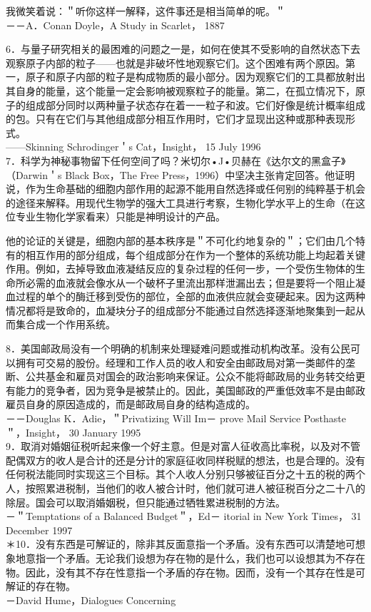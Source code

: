 我微笑着说：＂听你这样一解释，这件事还是相当简单的呢。＂\\
－－A．Conan Doyle，A Study in Scarlet， 1887

6．与量子研究相关的最困难的问题之一是，如何在使其不受影响的自然状态下去观察原子内部的粒子——也就是非破坏性地观察它们。这个困难有两个原因。第一，原子和原子内部的粒子是构成物质的最小部分。因为观察它们的工具都放射出其自身的能量，这个能量一定会影响被观察粒子的能量。第二，在孤立情况下，原子的组成部分同时以两种量子状态存在着一一粒子和波。它们好像是统计概率组成的包。只有在它们与其他组成部分相互作用时，它们才显现出这种或那种表现形式。\\
——Skinning Schrodinger＇s Cat，Insight， 15 July 1996\\
7．科学为神秘事物留下任何空间了吗？米切尔•J•贝赫在《达尔文的黑盒子》（Darwin＇s Black Box，The Free Press，1996）中坚决主张肯定回答。他证明说，作为生命基础的细胞内部作用的起源不能用自然选择或任何别的纯粹基于机会的途径来解释。用现代生物学的强大工具进行考察，生物化学水平上的生命（在这位专业生物化学家看来）只能是神明设计的产品。

他的论证的关键是，细胞内部的基本秩序是＂不可化约地复杂的＂；它们由几个特有的相互作用的部分组成，每个组成部分在作为一个整体的系统功能上均起着关键作用。例如，去掉导致血液凝结反应的复杂过程的任何一步，一个受伤生物体的生命所必需的血液就会像水从一个破杯子里流出那样泄漏出去；但是要将一个阻止凝血过程的单个的酶迁移到受伤的部位，全部的血液供应就会变硬起来。因为这两种情况都将是致命的，血凝块分子的组成部分不能通过自然选择逐渐地聚集到一起从而集合成一个作用系统。

8．美国邮政局没有一个明确的机制来处理疑难问题或推动机构改革。没有公民可以拥有可交易的股份。经理和工作人员的收人和安全由邮政局对第一类邮件的垄断、公共基金和雇员对国会的政治影响来保证。公众不能将邮政局的业务转交给更有能力的竞争者，因为竞争是被禁止的。因此，美国邮政的严重低效率不是由邮政雇员自身的原因造成的，而是邮政局自身的结构造成的。\\
－－Douglas K．Adie，＂Privatizing Will Im－ prove Mail Service Posthaste＂，Insight， 30 January 1995\\
9．取消对婚姻征税听起来像一个好主意。但是对富人征收高比率税，以及对不管配偶双方的收人是合计的还是分计的家庭征收同样税赋的想法，也是合理的。没有任何税法能同时实现这三个目标。其个人收人分别只够被征百分之十五的税的两个人，按照累进税制，当他们的收人被合计时，他们就可进人被征税百分之二十八的除层。国会可以取消婚姻税，但只能通过牺牲累进税制的方法。\\
－＂Temptations of a Balanced Budget＂，Ed－ itorial in New York Times， 31 December 1997\\
＊10．没有东西是可解证的，除非其反面意指一个矛盾。没有东西可以清楚地可想象地意指一个矛盾。无论我们设想为存在物的是什么，我们也可以设想其为不存在物。因此，没有其不存在性意指一个矛盾的存在物。因而，没有一个其存在性是可解证的存在物。\\
－David Hume，Dialogues Concerning

